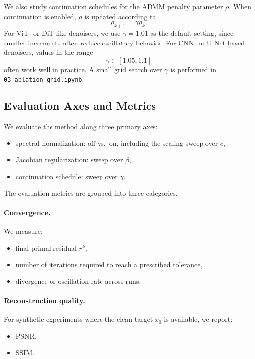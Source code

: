 \documentclass{article}
\begin{document}
We also study continuation schedules for the ADMM penalty parameter $\rho$.
When continuation is enabled, $\rho$ is updated according to
\begin{equation}
    \rho_{k+1} = \gamma \rho_k.
\end{equation}
For ViT- or DiT-like denoisers, we use $\gamma = 1.01$ as the default setting, since smaller increments often reduce oscillatory behavior.
For CNN- or U-Net-based denoisers, values in the range
\begin{equation}
    \gamma \in [1.05, 1.1]
\end{equation}
often work well in practice.
A small grid search over $\gamma$ is performed in \texttt{03\_ablation\_grid.ipynb}.

\subsection{Evaluation Axes and Metrics}
We evaluate the method along three primary axes:
\begin{itemize}
    \item spectral normalization: off vs.\ on, including the scaling sweep over $c$,
    \item Jacobian regularization: sweep over $\beta$,
    \item continuation schedule: sweep over $\gamma$.
\end{itemize}

The evaluation metrics are grouped into three categories.

\paragraph{Convergence.}
We measure:
\begin{itemize}
    \item final primal residual $r^k$,
    \item number of iterations required to reach a prescribed tolerance,
    \item divergence or oscillation rate across runs.
\end{itemize}

\paragraph{Reconstruction quality.}
For synthetic experiments where the clean target $x_0$ is available, we report:
\begin{itemize}
    \item PSNR,
    \item SSIM.
\end{itemize}
\end{document}

